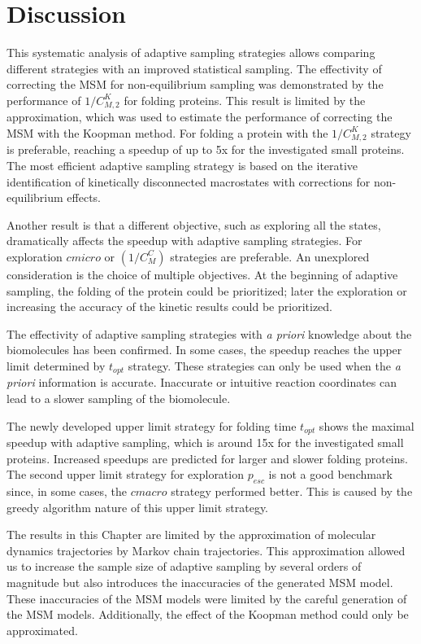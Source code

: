 \section{\label{sec:conclusion}Discussion}


This systematic analysis of adaptive sampling strategies allows comparing different strategies with an improved statistical sampling.
The effectivity of correcting the MSM for non-equilibrium sampling was demonstrated by the performance of $1/C_{M,2}^K$ for folding proteins. This result is limited by the approximation, which was used to estimate the performance of correcting the MSM with the Koopman method. For folding a protein with the $1/C_{M,2}^K$ strategy is preferable, reaching a speedup of up to 5x for the investigated small proteins. The most efficient adaptive sampling strategy is based on the iterative identification of kinetically disconnected macrostates with corrections for non-equilibrium effects.

Another result is that a different objective, such as exploring all the states, dramatically affects the speedup with adaptive sampling strategies. For exploration $cmicro$ or  $(1/C_M^C)$ strategies are preferable. 
An unexplored consideration is the choice of multiple objectives. At the beginning of adaptive sampling, the folding of the protein could be prioritized; later the exploration or increasing the accuracy of the kinetic results could be prioritized.

The effectivity of adaptive sampling strategies with \emph{a priori} knowledge about the biomolecules has been confirmed. In some cases, the speedup reaches the upper limit determined by $t_{opt}$ strategy. These strategies can only be used when the \emph{a priori} information is accurate. Inaccurate or intuitive reaction coordinates can lead to a slower sampling of the biomolecule.

The newly developed upper limit strategy for folding time $t_{opt}$ shows the maximal speedup with adaptive sampling, which is around 15x for the investigated small proteins. Increased speedups are predicted for larger and slower folding proteins. The second upper limit strategy for exploration $p_{esc}$ is not a good benchmark since, in some cases, the $cmacro$ strategy performed better. This is caused by the greedy algorithm nature of this upper limit strategy.

The results in this Chapter are limited by the approximation of molecular dynamics trajectories by Markov chain trajectories. This approximation allowed us to increase the sample size of adaptive sampling by several orders of magnitude but also introduces the inaccuracies of the generated MSM model. These inaccuracies of the MSM models were limited by the careful generation of the MSM models. Additionally, the effect of the Koopman method could only be approximated.

